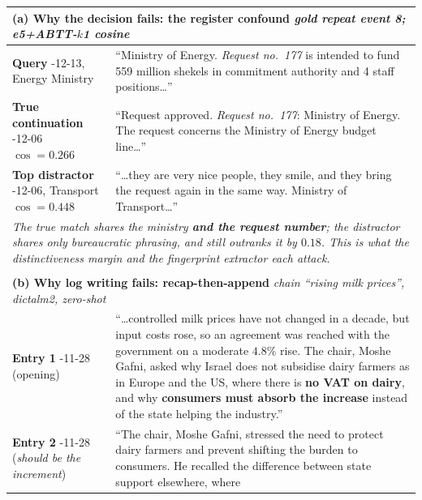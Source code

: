 \documentclass[11pt]{article}
\begin{document}
\begin{table}[t]
\centering\small
\begin{tabular}{p{}p{}}
\hline
\multicolumn{2}{l}{\textbf{(a) Why the decision fails: the register confound}
 \quad \emph{gold repeat event 8; e5+ABTT-$k$1 cosine}} \\
\hline
\textbf{Query} \newline 2022-12-13, Energy Ministry &
``Ministry of Energy. \emph{Request no.~177} is intended to fund 559 million shekels in
commitment authority and 4 staff positions\ldots'' \\[2pt]
\textbf{True continuation} \newline 2022-12-06 \hfill $\cos = \mathbf{0.266}$ &
``Request approved. \emph{Request no.~177}: Ministry of Energy. The request concerns the
Ministry of Energy budget line\ldots'' \\[2pt]
\textbf{Top distractor} \newline 2022-12-06, Transport \hfill $\cos = \mathbf{0.448}$ &
``\ldots they are very nice people, they smile, and they bring the request again in the same
way. Ministry of Transport\ldots'' \\
\hline
\multicolumn{2}{p{0.94\textwidth}}{\emph{The true match shares the ministry \textbf{and the
request number}; the distractor shares only bureaucratic phrasing, and still outranks it by
$0.18$. This is what the distinctiveness margin and the fingerprint extractor each attack.}}\\
\hline
\\[-6pt]
\hline
\multicolumn{2}{l}{\textbf{(b) Why log writing fails: recap-then-append}
 \quad \emph{chain ``rising milk prices'', dictalm2, zero-shot}} \\
\hline
\textbf{Entry 1} \newline 2022-11-28 (opening) &
``\ldots controlled milk prices have not changed in a decade, but input costs rose, so an
agreement was reached with the government on a moderate $4.8\%$ rise. The chair, Moshe
Gafni, asked why Israel does not subsidise dairy farmers as in Europe and the US, where
there is \textbf{no VAT on dairy}, and why \textbf{consumers must absorb the increase}
instead of the state helping the industry.'' \\[2pt]
\textbf{Entry 2} \newline 2022-11-28 (\emph{should be the increment}) &
``The chair, Moshe Gafni, stressed the need to protect dairy farmers and prevent shifting
the burden to consumers. He recalled the difference between state support elsewhere, where

\end{tabular}
\end{table}
\end{document}
